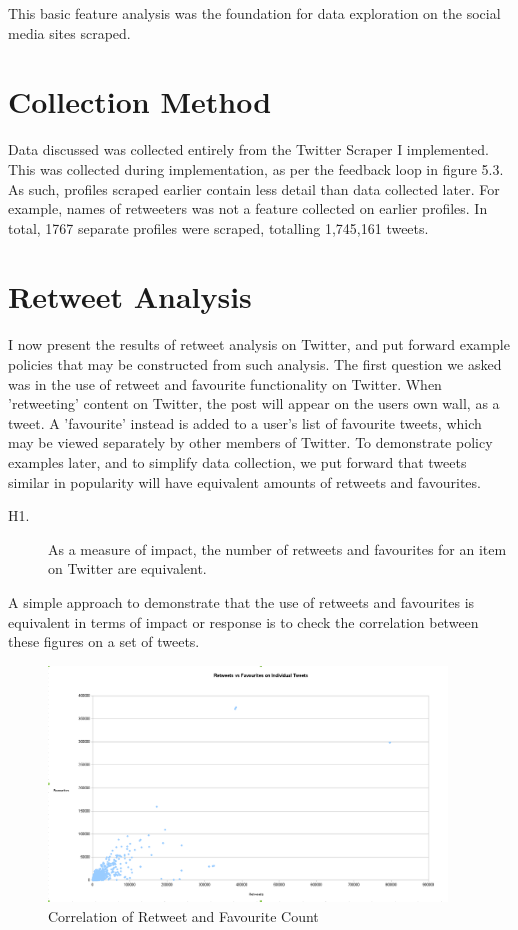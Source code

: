 This basic feature analysis was the foundation for data exploration on the social media sites scraped. 

\section{Collection Method}

Data discussed was collected entirely from the Twitter Scraper I implemented. This was collected during implementation, as per the feedback loop in figure 5.3. As such, profiles scraped earlier contain less detail than data collected later. For example, names of retweeters was not a feature collected on earlier profiles. In total, 1767 separate profiles were scraped, totalling 1,745,161 tweets. 


\section{Retweet Analysis}

I now present the results of retweet analysis on Twitter, and put forward example policies that may be constructed from such analysis. The first question we asked was in the use of retweet and favourite functionality on Twitter. When 'retweeting' content on Twitter, the post will appear on the users own wall, as a tweet. A 'favourite' instead is added to a user's list of favourite tweets, which may be viewed separately by other members of Twitter. To demonstrate policy examples later, and to simplify data collection, we put forward that tweets similar in popularity will have equivalent amounts of retweets and favourites. 

\begin{description}
 \item [H1.]{As a measure of impact, the number of retweets and favourites for an item on Twitter are equivalent.}
\end{description}

A simple approach to demonstrate that the use of retweets and favourites is equivalent in terms of impact or response is to check the correlation between these figures on a set of tweets. 

\begin{figure}[h!]
\centering
\includegraphics[width=400px]{Images/retweets_vs_favourites.pdf}
\caption{Correlation of Retweet and Favourite Count}
\end{figure}

